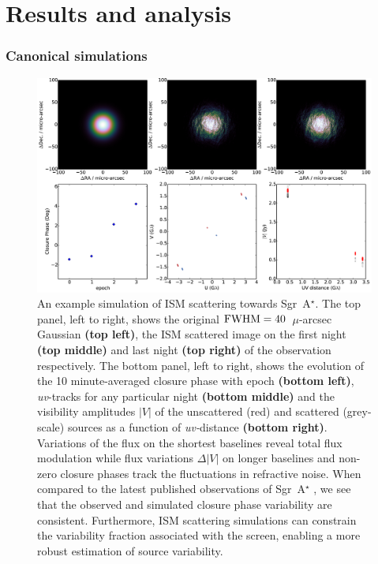 \chapter{Results and analysis}

\subsection{Canonical simulations}


\begin{figure}
\begin{center}
\includegraphics[width=\columnwidth]{Images/ism}
\caption{An example simulation of ISM scattering towards Sgr~A$^{\star}$.  The top panel, left to right, shows the original $\rm FWHM = 40$~$\mu$-arcsec Gaussian {\bf (top left)}, the ISM scattered image on the first night {\bf (top middle)} and last night {\bf (top right)} of the observation respectively.  The bottom panel, left to right,  shows the evolution of the 10 minute-averaged closure phase with epoch {\bf (bottom left)}, {\sl uv}-tracks for any particular night {\bf (bottom middle)} and the visibility amplitudes $|V|$ of the unscattered (red) and scattered (grey-scale) sources as a function of {\sl uv-}distance {\bf (bottom right)}. Variations of the flux on the shortest baselines reveal total flux modulation while flux variations $\Delta |V|$ on longer baselines and non-zero closure phases track the fluctuations in refractive noise. When compared to the latest published observations of Sgr~A$^{\star}$ \protect\citep{Fish_2016}, we see that the observed and simulated closure phase variability are consistent. Furthermore, ISM scattering simulations can constrain the variability fraction associated with the screen, enabling a more robust estimation of source variability.\label{ISM_sequence}%
}
\end{center}
\end{figure}

